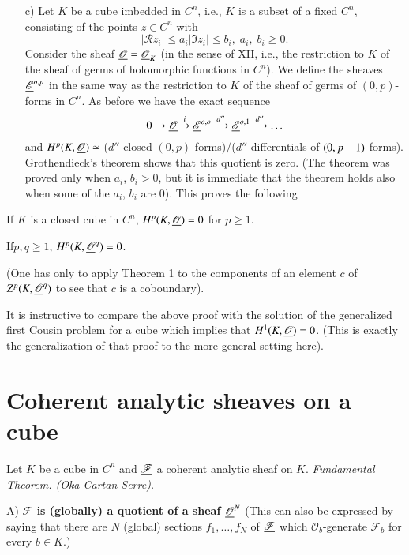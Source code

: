 \begin{itemize}
\item[c)] Let $K$ be a cube imbedded in $C^n$, i.e., $K$ is a subset of a
  fixed $C^n$, consisting of the points $z \in C^n$ with 
$$
|\mathscr{R} z_i| \leq a_i |\mathfrak{I} z_i| \leq b_i, \;  a_i,
\; b_i \geq 0.
$$
Consider the sheaf $\underline{\mathscr{O}} = \underline{\mathscr{O}}_K$ (in the sense
of XII, i.e., the restriction to $K$ of the sheaf of germs of
holomorphic functions in $C^n$). We define the sheaves
$\underline{\mathscr{E}}^{o,p}$ in the same way as the restriction to $K$ of
the sheaf of germs of $(0,p)$-forms in $C^n$. As before we have the
exact sequence 
$$
0 \to \underline{\mathscr{O}} \xrightarrow{i} \underline{\mathscr{E}}^{o,o}
\xrightarrow{d''} \underline{\mathscr{E}}^{o,1} \xrightarrow{d''} \ldots 
$$
and
{$H^p (K,\underline{\mathscr{O}}) \simeq $ ($d''$-closed
  $(0,p)$-forms)/($d''$-differentials of $(0,\break p-1)$-forms).}
Grothendieck's theorem shows that this quotient is zero. (The theorem
was proved only when $a_i$, $b_i > 0$, but it is immediate that the
theorem holds also when some of the $a_i$, $b_i$ are $0$). This proves
the following 
\end{itemize}

\setcounter{thm}{0}
\begin{thm}\label{chap14:thm1}
If $K$ is a closed cube in $C^n$, $H^p(K,\underline{\mathscr{O}}) =0$ for $p
\geq 1$. 
\end{thm}

\begin{coro*}
If\pageoriginale $p, q \geq 1$, $H^p (K, \underline{\mathscr{O}}^q) = 0$.  

(One has only to apply Theorem 1 to the components of an element $c$
of $Z^p (K, \underline{\mathscr{O}}^q)$ to see that $c$ is a coboundary).
\end{coro*}

It is instructive to compare the above proof with the solution of the
generalized first Cousin problem for a cube which implies that $H^1(K,\break
\u{\mathscr{O}}) = 0$. (This is exactly the generalization of that
proof to the more general setting here).


\section{Coherent analytic sheaves on a cube}\label{chap14:sec2}
Let $K$ be a cube in $C^n$ and $\underline{\mathscr{F}}$ a coherent analytic
sheaf on $K$. \textit{Fundamental Theorem. (Oka-Cartan-Serre).}

A) \textbf{$\mathscr{F}$ is (globally) a quotient of a sheaf
  $\underline{\mathscr{O}}^N$} (This can also be expressed by saying that
there are $N$ (global) sections $f_1, \ldots, f_N$ of
$\underline{\mathscr{F}}$ which $\mathscr{O}_b$-generate $\mathscr{F}_b$ for
every $b \in K$.)  

